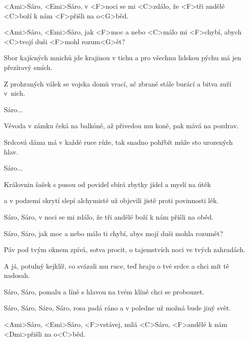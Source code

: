 

\zr
<Ami>Sáro, <Emi>Sáro, v <F>noci se mi <C>zdálo,
že <F>tři andělé <C>boží k nám <F>přišli na o<G>běd.

<Ami>Sáro, <Emi>Sáro, jak <F>moc a nebo <C>málo
mi <F>chybí, abych <C>tvojí duši <F>mohl rozum<G>ět?
\kr

\zs
Sbor kajícných mnichů jde krajinou v tichu
a pro všechnu lidskou pýchu má jen přezíravý smích.

Z prohraných válek se vojska domů vrací,
ač zbraně stále burácí a bitva zuří v~nich.
\ks

\zr
Sáro...
\kr

\zs
Vévoda v zámku čeká na balkóně,
až přivedou mu koně, pak mává na pozdrav.

Srdcová dáma má v každé ruce růže,
tak snadno pohřbít může sto urozených hlav.
\ks

\zr
Sáro...
\kr

\zs
Královnin šašek s pusou od povidel
sbírá zbytky jídel a myslí na útěk

a v podzemí skrytí slepí alchymisté
už objevili jistě proti povinnosti lék.
\ks

\zr
Sáro, Sáro, v noci se mi zdálo,
že tři andělé boží k nám přišli na oběd.

Sáro, Sáro, jak moc a nebo málo
ti chybí, abys mojí duši mohla rozumět?
\kr

\zs
Páv pod tvým oknem zpívá, sotva procit,
o tajemstvích noci ve tvých zahradách.

A já, potulný kejklíř, co svázali mu ruce,
teď hraju o tvé srdce a chci mít tě nadosah.
\ks

\zr
Sáro, Sáro, pomalu a líně
s hlavou na tvém klíně chci se probouzet.

Sáro, Sáro, Sáro, Sáro, rosa padá ráno
a v poledne už možná bude jiný svět.
\kr

\zs
<Ami>Sáro, <Emi>Sáro, <F>vstávej, milá <C>Sáro,
<F>andělé k nám <Dmi>přišli na o<C>běd.
\ks

\kp

